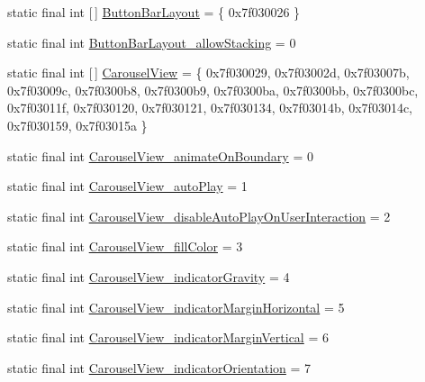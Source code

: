 \begin{DoxyCompactItemize}
\item 
static final int \mbox{[}$\,$\mbox{]} \mbox{\hyperlink{classcom_1_1synnapps_1_1carouselview_1_1_r_1_1styleable_a5840a379eb3a134b53885ad81d08ef08}{Button\+Bar\+Layout}} = \{ 0x7f030026 \}
\item 
static final int \mbox{\hyperlink{classcom_1_1synnapps_1_1carouselview_1_1_r_1_1styleable_aeba3c68f8fd0d8a1e7e2c7481ac6760c}{Button\+Bar\+Layout\+\_\+allow\+Stacking}} = 0
\item 
static final int \mbox{[}$\,$\mbox{]} \mbox{\hyperlink{classcom_1_1synnapps_1_1carouselview_1_1_r_1_1styleable_a511fed7a7ba6dfc5960d6cebc6a1a93d}{Carousel\+View}} = \{ 0x7f030029, 0x7f03002d, 0x7f03007b, 0x7f03009c, 0x7f0300b8, 0x7f0300b9, 0x7f0300ba, 0x7f0300bb, 0x7f0300bc, 0x7f03011f, 0x7f030120, 0x7f030121, 0x7f030134, 0x7f03014b, 0x7f03014c, 0x7f030159, 0x7f03015a \}
\item 
static final int \mbox{\hyperlink{classcom_1_1synnapps_1_1carouselview_1_1_r_1_1styleable_ad289d6f81f3947488d8895683e802951}{Carousel\+View\+\_\+animate\+On\+Boundary}} = 0
\item 
static final int \mbox{\hyperlink{classcom_1_1synnapps_1_1carouselview_1_1_r_1_1styleable_aaa681168e9f8ad5cd598cd7414ad89a9}{Carousel\+View\+\_\+auto\+Play}} = 1
\item 
static final int \mbox{\hyperlink{classcom_1_1synnapps_1_1carouselview_1_1_r_1_1styleable_af46d6bcd7b01e742d7ced27a4d3a594b}{Carousel\+View\+\_\+disable\+Auto\+Play\+On\+User\+Interaction}} = 2
\item 
static final int \mbox{\hyperlink{classcom_1_1synnapps_1_1carouselview_1_1_r_1_1styleable_a4027ab728f4bec0f1aad01a7592ee709}{Carousel\+View\+\_\+fill\+Color}} = 3
\item 
static final int \mbox{\hyperlink{classcom_1_1synnapps_1_1carouselview_1_1_r_1_1styleable_a42467a05bf030581bc67addd2d1cd45c}{Carousel\+View\+\_\+indicator\+Gravity}} = 4
\item 
static final int \mbox{\hyperlink{classcom_1_1synnapps_1_1carouselview_1_1_r_1_1styleable_a1b1fccc847b9b68b33f47580f129c999}{Carousel\+View\+\_\+indicator\+Margin\+Horizontal}} = 5
\item 
static final int \mbox{\hyperlink{classcom_1_1synnapps_1_1carouselview_1_1_r_1_1styleable_a15a2692ac5772cb67dbcb334ff6c0335}{Carousel\+View\+\_\+indicator\+Margin\+Vertical}} = 6
\item 
static final int \mbox{\hyperlink{classcom_1_1synnapps_1_1carouselview_1_1_r_1_1styleable_aae1aafa651281032640b553ca353b38a}{Carousel\+View\+\_\+indicator\+Orientation}} = 7

\end{DoxyCompactItemize}

